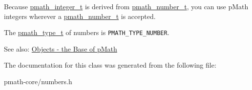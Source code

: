 Because \hyperlink{classpmath__integer__t}{pmath\_\-integer\_\-t} is derived from \hyperlink{classpmath__number__t}{pmath\_\-number\_\-t}, you can use pMath integers wherever a \hyperlink{classpmath__number__t}{pmath\_\-number\_\-t} is accepted.

The \hyperlink{group__objects_ge2646df76dcb0113715322b13a1f36f0}{pmath\_\-type\_\-t} of numbers is {\tt PMATH\_\-TYPE\_\-NUMBER}.

\begin{Desc}
\item[See also:]\hyperlink{group__objects}{Objects - the Base of pMath} \end{Desc}


The documentation for this class was generated from the following file:\begin{CompactItemize}
\item 
pmath-core/numbers.h\end{CompactItemize}
